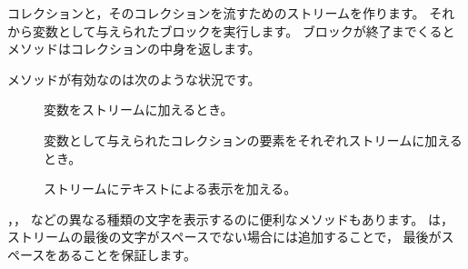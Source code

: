 \documentclass[a4paper,10pt,twoside]{book}
\begin{document}
{%
コレクションと，そのコレクションを流すためのストリームを作ります。
それから変数として与えられたブロックを実行します。
ブロックが終了までくるとメソッドはコレクションの中身を返します。


メソッドが有効なのは次のような状況です。

\begin{description}

\item[] 変数をストリームに加えるとき。
\item[] 変数として与えられたコレクションの要素をそれぞれストリームに加えるとき。
\item[] ストリームにテキストによる表示を加える。
\end{description}

，， 
などの異なる種類の文字を表示するのに便利なメソッドもあります。
は，ストリームの最後の文字がスペースでない場合には追加することで，
最後がスペースをあることを保証します。

}
\end{document}
